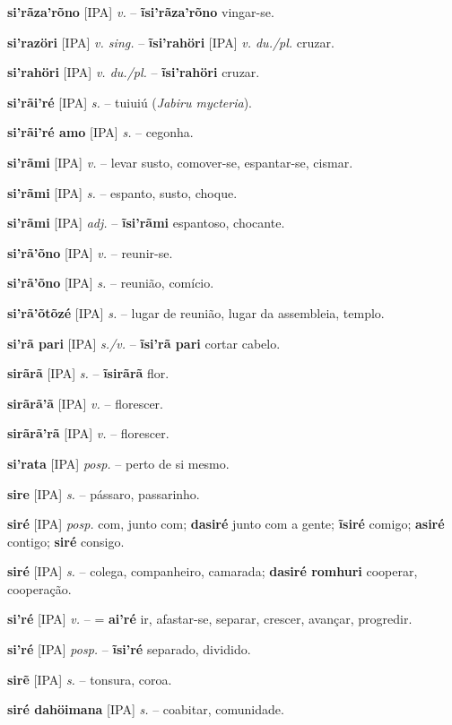 \textbf{si'rãza'rõno} [IPA] \textit{v.} -- \textbf{ĩsi'rãza'rõno} vingar-se.

\textbf{si'razöri} [IPA] \textit{v. sing.} -- \textbf{ĩsi'rahöri} [IPA] \textit{v. du./pl.} cruzar.

\textbf{si'rahöri} [IPA] \textit{v. du./pl.} -- \textbf{ĩsi'rahöri} cruzar.

\textbf{si'rãi'ré} [IPA] \textit{s.} -- tuiuiú (\textit{Jabiru mycteria}).

\textbf{si'rãi'ré amo} [IPA] \textit{s.} -- cegonha.

\textbf{si'rãmi} [IPA] \textit{v.} -- levar susto, comover-se, espantar-se, cismar.

\textbf{si'rãmi} [IPA] \textit{s.} -- espanto, susto, choque.

\textbf{si'rãmi} [IPA] \textit{adj.} -- \textbf{ĩsi'rãmi} espantoso, chocante.

\textbf{si'rã'õno} [IPA] \textit{v.} -- reunir-se.

\textbf{si'rã'õno} [IPA] \textit{s.} -- reunião, comício.

\textbf{si'rã'õtõzé} [IPA] \textit{s.} -- lugar de reunião, lugar da assembleia, templo.

\textbf{si'rã pari} [IPA] \textit{s./v.} -- \textbf{ĩsi'rã pari} cortar cabelo.

\textbf{sirãrã} [IPA] \textit{s.} -- \textbf{ĩsirãrã} flor.

\textbf{sirãrã'ã} [IPA] \textit{v.} -- florescer.

\textbf{sirãrã'rã} [IPA] \textit{v.} -- florescer.

\textbf{si'rata} [IPA] \textit{posp.} -- perto de si mesmo.

\textbf{sire} [IPA] \textit{s.} -- pássaro, passarinho.

\textbf{siré} [IPA] \textit{posp.} com, junto com; \textbf{dasiré} junto com a gente; \textbf{ĩsiré} comigo; \textbf{asiré} contigo; \textbf{siré} consigo.

\textbf{siré} [IPA] \textit{s.} -- colega, companheiro, camarada; \textbf{dasiré romhuri} cooperar, cooperação.

\textbf{si'ré} [IPA] \textit{v.} -- = \textbf{ai'ré} ir, afastar-se, separar, crescer, avançar, progredir.

\textbf{si'ré} [IPA] \textit{posp.} -- \textbf{ĩsi'ré} separado, dividido.

\textbf{sirẽ} [IPA] \textit{s.} -- tonsura, coroa.

\textbf{siré dahöimana} [IPA] \textit{s.} -- coabitar, comunidade.

